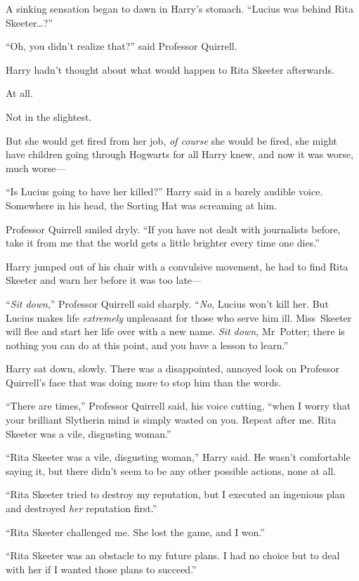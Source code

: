 A sinking sensation began to dawn in Harry’s stomach. “Lucius was behind Rita Skeeter…?”

“Oh, you didn’t realize that?” said Professor Quirrell.

Harry hadn’t thought about what would happen to Rita Skeeter afterwards.

At all.

Not in the slightest.

But she would get fired from her job, \emph{of course} she would be fired, she might have children going through Hogwarts for all Harry knew, and now it was worse, much worse—

“Is Lucius going to have her killed?” Harry said in a barely audible voice. Somewhere in his head, the Sorting Hat was screaming at him.

Professor Quirrell smiled dryly. “If you have not dealt with journalists before, take it from me that the world gets a little brighter every time one dies.”

Harry jumped out of his chair with a convulsive movement, he had to find Rita Skeeter and warn her before it was too late—

“\emph{Sit down},” Professor Quirrell said sharply. “\emph{No}, Lucius won’t kill her. But Lucius makes life \emph{extremely} unpleasant for those who serve him ill. Miss~Skeeter will flee and start her life over with a new name. \emph{Sit down,} Mr~Potter; there is nothing you can do at this point, and you have a lesson to learn.”

Harry sat down, slowly. There was a disappointed, annoyed look on Professor Quirrell’s face that was doing more to stop him than the words.

“There are times,” Professor Quirrell said, his voice cutting, “when I worry that your brilliant Slytherin mind is simply wasted on you. Repeat after me. Rita Skeeter was a vile, disgusting woman.”

“Rita Skeeter was a vile, disgusting woman,” Harry said. He wasn’t comfortable saying it, but there didn’t seem to be any other possible actions, none at all.

“Rita Skeeter tried to destroy my reputation, but I executed an ingenious plan and destroyed \emph{her} reputation first.”

“Rita Skeeter challenged me. She lost the game, and I won.”

“Rita Skeeter was an obstacle to my future plans. I had no choice but to deal with her if I wanted those plans to succeed.”

